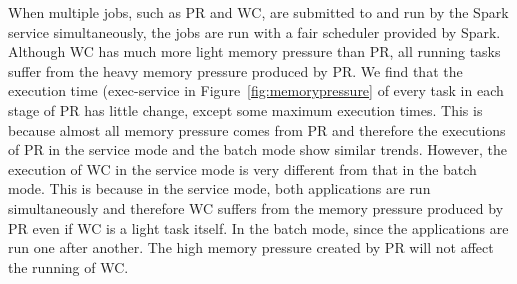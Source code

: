 
When multiple jobs, such as PR and WC, are submitted to and run by the Spark 
service simultaneously, the jobs are run with a fair scheduler provided by Spark. 
Although WC has much more light memory pressure than PR, all running tasks  
suffer from the heavy memory pressure produced by PR. We find that the execution time 
(exec-service in Figure~\ref{fig:memorypressure} of every task in each stage of PR has little change, except some maximum execution times. This is because 
almost all memory pressure comes from PR and therefore the executions of PR in the service mode and the batch mode show similar trends. However, the execution of WC in the service mode is very different from that in the batch mode. This is because in the service mode, both applications are run simultaneously and therefore WC suffers from the memory pressure produced by PR even if WC is a
light task itself. In the batch mode, since the applications are run one after another. The high memory pressure created by PR will not affect the running of WC.


